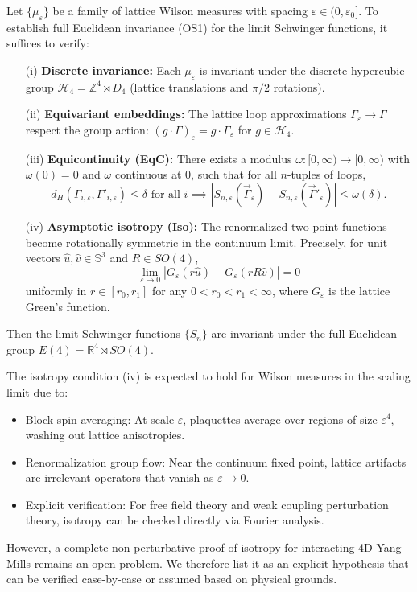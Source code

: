 \documentclass[11pt]{amsart}
\begin{document}
\begin{theorem}\label{thm:os1-isotropy-criterion}
Let $\{\mu_\varepsilon\}$ be a family of lattice Wilson measures with spacing $\varepsilon \in (0, \varepsilon_0]$. To establish full Euclidean invariance (OS1) for the limit Schwinger functions, it suffices to verify:
\begin{itemize}
  \item[(i)] \textbf{Discrete invariance:} Each $\mu_\varepsilon$ is invariant under the discrete hypercubic group $\mathcal{H}_4 = \mathbb{Z}^4 \rtimes D_4$ (lattice translations and $\pi/2$ rotations).
  \item[(ii)] \textbf{Equivariant embeddings:} The lattice loop approximations $\Gamma_{\varepsilon} \to \Gamma$ respect the group action: $(g \cdot \Gamma)_\varepsilon = g \cdot \Gamma_\varepsilon$ for $g \in \mathcal{H}_4$.
  \item[(iii)] \textbf{Equicontinuity (EqC):} There exists a modulus $\omega: [0,\infty) \to [0,\infty)$ with $\omega(0) = 0$ and $\omega$ continuous at 0, such that for all $n$-tuples of loops,
  \[
    d_H(\Gamma_{i,\varepsilon}, \Gamma'_{i,\varepsilon}) \le \delta \text{ for all } i \implies |S_{n,\varepsilon}(\vec{\Gamma}_\varepsilon) - S_{n,\varepsilon}(\vec{\Gamma}'_\varepsilon)| \le \omega(\delta).
  \]
  \item[(iv)] \textbf{Asymptotic isotropy (Iso):} The renormalized two-point functions become rotationally symmetric in the continuum limit. Precisely, for unit vectors $\hat{u}, \hat{v} \in \mathbb{S}^3$ and $R \in SO(4)$,
  \[
    \lim_{\varepsilon \to 0} \left| G_\varepsilon(r\hat{u}) - G_\varepsilon(r R\hat{v}) \right| = 0
  \]
  uniformly in $r \in [r_0, r_1]$ for any $0 < r_0 < r_1 < \infty$, where $G_\varepsilon$ is the lattice Green's function.
\end{itemize}
Then the limit Schwinger functions $\{S_n\}$ are invariant under the full Euclidean group $E(4) = \mathbb{R}^4 \rtimes SO(4)$.
\end{theorem}

\begin{remark}
The isotropy condition (iv) is expected to hold for Wilson measures in the scaling limit due to:
\begin{itemize}
  \item Block-spin averaging: At scale $\varepsilon$, plaquettes average over regions of size $\varepsilon^4$, washing out lattice anisotropies.
  \item Renormalization group flow: Near the continuum fixed point, lattice artifacts are irrelevant operators that vanish as $\varepsilon \to 0$.
  \item Explicit verification: For free field theory and weak coupling perturbation theory, isotropy can be checked directly via Fourier analysis.
\end{itemize}
However, a complete non-perturbative proof of isotropy for interacting 4D Yang-Mills remains an open problem. We therefore list it as an explicit hypothesis that can be verified case-by-case or assumed based on physical grounds.
\end{remark}
\end{document}

